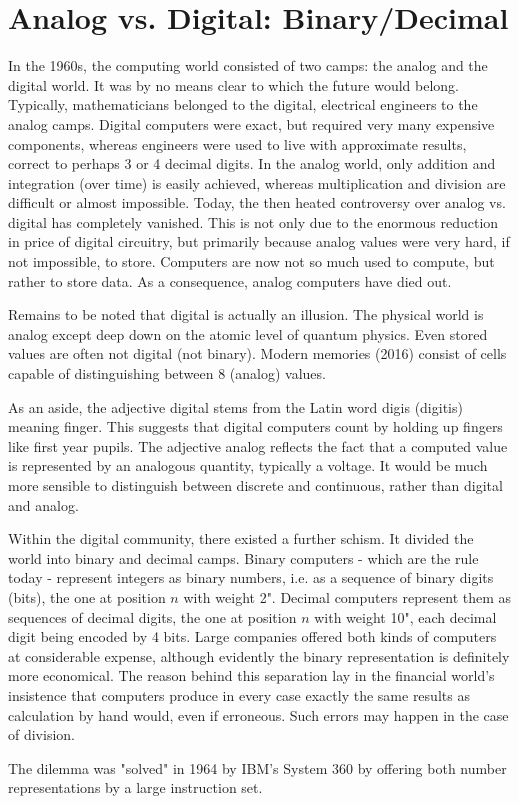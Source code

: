 \section{Analog vs. Digital: Binary/Decimal}
In the 1960s, the computing world consisted of two camps: the analog and the
digital world. It was by no means clear to which the future would belong. Typically,
mathematicians belonged to the digital, electrical engineers to the analog camps.
Digital computers were exact, but required very many expensive components,
whereas engineers were used to live with approximate results, correct to perhaps 3
or 4 decimal digits. In the analog world, only addition and integration (over time) is
easily achieved, whereas multiplication and division are difficult or almost
impossible. Today, the then heated controversy over analog vs. digital has
completely vanished. This is not only due to the enormous reduction in price of
digital circuitry, but primarily because analog values were very hard, if not
impossible, to store. Computers are now not so much used to compute, but rather
to store data. As a consequence, analog computers have died out.

Remains to be noted that digital is actually an illusion. The physical world is analog
except deep down on the atomic level of quantum physics. Even stored values are
often not digital (not binary). Modern memories (2016) consist of cells capable of
distinguishing between 8 (analog) values.

As an aside, the adjective digital stems from the Latin word digis (digitis) meaning
finger. This suggests that digital computers count by holding up fingers like first
year pupils. The adjective analog reflects the fact that a computed value is
represented by an analogous quantity, typically a voltage. It would be much more
sensible to distinguish between discrete and continuous, rather than digital and
analog.

Within the digital community, there existed a further schism. It divided the world
into binary and decimal camps. Binary computers - which are the rule today -
represent integers as binary numbers, i.e. as a sequence of binary digits (bits), the
one at position $n$ with weight 2". Decimal computers represent them as sequences
of decimal digits, the one at position $n$ with weight 10", each decimal digit being
encoded by 4 bits. Large companies offered both kinds of computers at
considerable expense, although evidently the binary representation is definitely
more economical. The reason behind this separation lay in the financial world's
insistence that computers produce in every case exactly the same results as
calculation by hand would, even if erroneous. Such errors may happen in the case
of division.

The dilemma was "solved" in 1964 by IBM's System 360 by offering both number
representations by a large instruction set.
